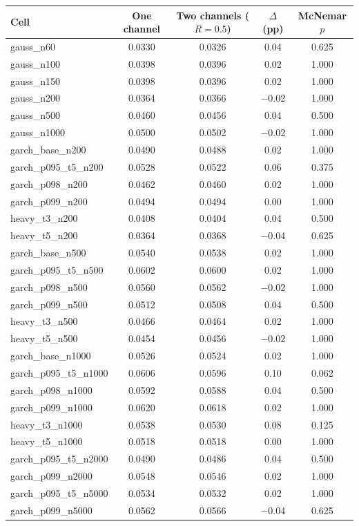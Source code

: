 \begin{tabular}{lcccc}
\toprule
Cell & One channel & Two channels ($R = 0.5$) & $\Delta$ (pp) & McNemar $p$ \\
\midrule
gauss\_n60 & 0.0330 & 0.0326 & 0.04 & 0.625 \\
gauss\_n100 & 0.0398 & 0.0396 & 0.02 & 1.000 \\
gauss\_n150 & 0.0398 & 0.0396 & 0.02 & 1.000 \\
gauss\_n200 & 0.0364 & 0.0366 & $-$0.02 & 1.000 \\
gauss\_n500 & 0.0460 & 0.0456 & 0.04 & 0.500 \\
gauss\_n1000 & 0.0500 & 0.0502 & $-$0.02 & 1.000 \\
garch\_base\_n200 & 0.0490 & 0.0488 & 0.02 & 1.000 \\
garch\_p095\_t5\_n200 & 0.0528 & 0.0522 & 0.06 & 0.375 \\
garch\_p098\_n200 & 0.0462 & 0.0460 & 0.02 & 1.000 \\
garch\_p099\_n200 & 0.0494 & 0.0494 & 0.00 & 1.000 \\
heavy\_t3\_n200 & 0.0408 & 0.0404 & 0.04 & 0.500 \\
heavy\_t5\_n200 & 0.0364 & 0.0368 & $-$0.04 & 0.625 \\
garch\_base\_n500 & 0.0540 & 0.0538 & 0.02 & 1.000 \\
garch\_p095\_t5\_n500 & 0.0602 & 0.0600 & 0.02 & 1.000 \\
garch\_p098\_n500 & 0.0560 & 0.0562 & $-$0.02 & 1.000 \\
garch\_p099\_n500 & 0.0512 & 0.0508 & 0.04 & 0.500 \\
heavy\_t3\_n500 & 0.0466 & 0.0464 & 0.02 & 1.000 \\
heavy\_t5\_n500 & 0.0454 & 0.0456 & $-$0.02 & 1.000 \\
garch\_base\_n1000 & 0.0526 & 0.0524 & 0.02 & 1.000 \\
garch\_p095\_t5\_n1000 & 0.0606 & 0.0596 & 0.10 & 0.062 \\
garch\_p098\_n1000 & 0.0592 & 0.0588 & 0.04 & 0.500 \\
garch\_p099\_n1000 & 0.0620 & 0.0618 & 0.02 & 1.000 \\
heavy\_t3\_n1000 & 0.0538 & 0.0530 & 0.08 & 0.125 \\
heavy\_t5\_n1000 & 0.0518 & 0.0518 & 0.00 & 1.000 \\
garch\_p095\_t5\_n2000 & 0.0490 & 0.0486 & 0.04 & 0.500 \\
garch\_p099\_n2000 & 0.0548 & 0.0546 & 0.02 & 1.000 \\
garch\_p095\_t5\_n5000 & 0.0534 & 0.0532 & 0.02 & 1.000 \\
garch\_p099\_n5000 & 0.0562 & 0.0566 & $-$0.04 & 0.625 \\
\bottomrule
\end{tabular}
